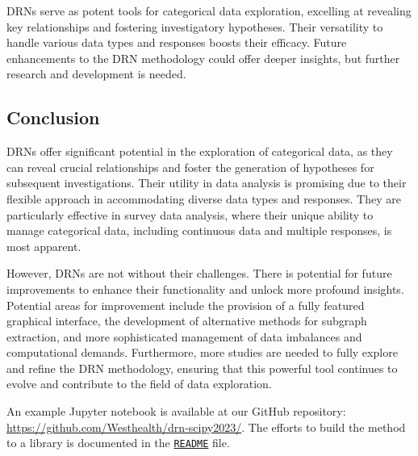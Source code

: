 DRNs serve as potent tools for categorical data exploration, excelling at revealing key relationships and fostering investigatory hypotheses. Their versatility to handle various data types and responses boosts their efficacy. Future enhancements to the DRN methodology could offer deeper insights, but further research and development is needed.

\subsection{Conclusion} \label{Conclusion}

DRNs offer significant potential in the exploration of categorical data, as they can reveal crucial relationships and foster the generation of hypotheses for subsequent investigations. Their utility in data analysis is promising due to their flexible approach in accommodating diverse data types and responses. They are particularly effective in survey data analysis, where their unique ability to manage categorical data, including continuous data and multiple responses, is most apparent.

However, DRNs are not without their challenges. There is potential for future improvements to enhance their functionality and unlock more profound insights. Potential areas for improvement include the provision of a fully featured graphical interface, the development of alternative methods for subgraph extraction, and more sophisticated management of data imbalances and computational demands. Furthermore, more studies are needed to fully explore and refine the DRN methodology, ensuring that this powerful tool continues to evolve and contribute to the field of data exploration.

An example Jupyter notebook is available at our GitHub repository: \url{https://github.com/Westhealth/drn-scipy2023/}. The efforts to build the method to a library is documented in the \href{https://github.com/WestHealth/drn-scipy2023/blob/master/README.md}{\texttt{README}} file.

